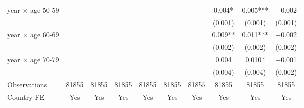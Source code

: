 \begin{tabular}[t]{lccccccccc}
year $\times$ age 50-59 &  &  &  &  &  &  & \num{0.004}* & \num{0.005}*** & \num{-0.002}\\
 &  &  &  &  &  &  & (\num{0.001}) & (\num{0.001}) & (\num{0.001})\\
year $\times$ age 60-69 &  &  &  &  &  &  & \num{0.009}** & \num{0.011}*** & \num{-0.002}\\
 &  &  &  &  &  &  & (\num{0.002}) & (\num{0.002}) & (\num{0.002})\\
year $\times$ age 70-79 &  &  &  &  &  &  & \num{0.004} & \num{0.010}* & \num{-0.001}\\
 &  &  &  &  &  &  & (\num{0.004}) & (\num{0.004}) & (\num{0.002})\\
\midrule
Observations & \num{81855} & \num{81855} & \num{81855} & \num{81855} & \num{81855} & \num{81855} & \num{81855} & \num{81855} & \num{81855}\\
Country FE & Yes & Yes & Yes & Yes & Yes & Yes & Yes & Yes & Yes\\
\bottomrule
\end{tabular}
